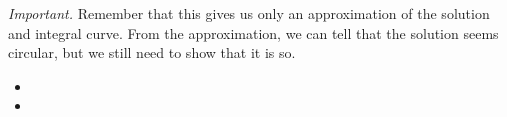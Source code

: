\begin{example}
\emph{Important. } Remember that this gives us only an approximation of the solution and integral curve. From the approximation, we can tell that the solution seems circular, but we still need to show that it is so.

\end{example}





%



\begin{video}
\begin{itemize}
	\item {}
	\item {}
\end{itemize}	
\end{video}


